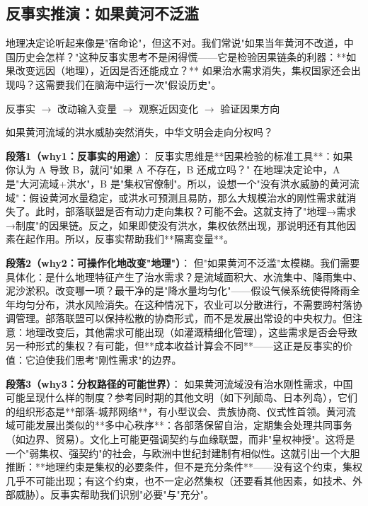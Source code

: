 \documentclass[openany, a4paper, 12pt]{book}
\newenvironment{logicmap}{
	\begin{tcolorbox}[
		colback=blue!5!white,      %
		colframe=blue!50!black,    %
		title=\textbf{逻辑地图 (Logic Map)}, %
		fonttitle=\bfseries,
		sharp corners=south,       %
		boxrule=0.5mm
		]
	\centering
	}{
	\end{tcolorbox}
}
\newenvironment{motivation}{
	\vspace{0.5em}
	\begin{tcolorbox}[
		colback=gray!10,           %
		colframe=gray!60,          %
		title=\textit{本章动机 (Motivation)},
		fonttitle=\bfseries,
		arc=0mm,                   %
		leftrule=3mm               %
		]
		\small \itshape %
	}{
	\end{tcolorbox}
	\vspace{1em}
}
\begin{document}
\subsection{反事实推演：如果黄河不泛滥}

\begin{motivation}
	地理决定论听起来像是"宿命论"，但这不对。我们常说"如果当年黄河不改道，中国历史会怎样？"这种反事实思考不是闲得慌——它是检验因果链条的利器：**如果改变远因（地理），近因是否还能成立？** 如果治水需求消失，集权国家还会出现吗？这需要我们在脑海中运行一次"假设历史"。
\end{motivation}

\begin{logicmap}
	反事实 $\rightarrow$ 改动输入变量 $\rightarrow$ 观察近因变化 $\rightarrow$ 验证因果方向
\end{logicmap}

\begin{questionbox}
	如果黄河流域的洪水威胁突然消失，中华文明会走向分权吗？
\end{questionbox}

\textbf{段落1（why1：反事实的用途）}：  
反事实思维是**因果检验的标准工具**：如果你认为 A 导致 B，就问"如果 A 不存在，B 还成立吗？" 在地理决定论中，A 是"大河流域+洪水"，B 是"集权官僚制"。所以，设想一个"没有洪水威胁的黄河流域"：假设黄河水量稳定，或洪水可预测且易防，那么大规模治水的刚性需求就消失了。此时，部落联盟是否有动力走向集权？可能不会。这就支持了"地理→需求→制度"的因果链。反之，如果即使没有洪水，集权依然出现，那说明还有其他因素在起作用。所以，反事实帮助我们**隔离变量**。

\textbf{段落2（why2：可操作化地改变"地理"）}：  
但"如果黄河不泛滥"太模糊。我们需要具体化：是什么地理特征产生了治水需求？是流域面积大、水流集中、降雨集中、泥沙淤积。改变哪一项？最干净的是"降水量均匀化"——假设气候系统使得降雨全年均匀分布，洪水风险消失。在这种情况下，农业可以分散进行，不需要跨村落协调管理。部落联盟可以保持松散的协商形式，而不是发展出常设的中央权力。但注意：地理改变后，其他需求可能出现（如灌溉精细化管理），这些需求是否会导致另一种形式的集权？有可能，但**成本收益计算会不同**——这正是反事实的价值：它迫使我们思考"刚性需求"的边界。

\textbf{段落3（why3：分权路径的可能世界）}：  
如果黄河流域没有治水刚性需求，中国可能呈现什么样的制度？参考同时期的其他文明（如下列颠岛、日本列岛），它们的组织形态是**部落-城邦网络**，有小型议会、贵族协商、仪式性首领。黄河流域可能发展出类似的**多中心秩序**：各部落保留自治，定期集会处理共同事务（如边界、贸易）。文化上可能更强调契约与血缘联盟，而非"皇权神授"。这将是一个"弱集权、强契约"的社会，与欧洲中世纪封建制有相似性。这就引出一个大胆推断：**地理约束是集权的必要条件，但不是充分条件**——没有这个约束，集权几乎不可能出现；有这个约束，也不一定必然集权（还要看其他因素，如技术、外部威胁）。反事实帮助我们识别"必要"与"充分"。
\end{document}
